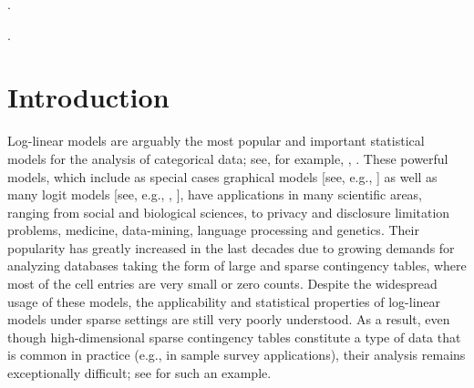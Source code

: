 \documentclass[aos,MSNbibl,nameyear,dvips]{arximspdf}
\begin{document}
\begin{frontmatter}
%
\begin{keyword}[class=AMS]
.
\end{keyword}
%
\begin{keyword}
.
\end{keyword}

\end{frontmatter}

\section{Introduction}

Log-linear models are arguably the most popular and important
statistical models for the analysis of categorical data; see, for
example, \citet{BFH75}, \citet{CHRISTENSEN97}. These powerful models,
which include as special cases graphical models [see, e.g.,
\citet{LAU96}] as well as many logit models [see, e.g., \citet{AGR02},
\citet{BFH75}], have applications in many scientific areas, ranging
from social and biological sciences, to privacy and disclosure
limitation problems, medicine, data-mining, language processing and
genetics. Their popularity has greatly increased in the last decades
due to growing demands for analyzing databases taking the form of large
and sparse contingency tables, where most of the cell entries are very
small or zero counts. Despite the widespread usage of these models, the
applicability and statistical properties of log-linear models under
sparse settings are still very poorly understood. As a result, even
though high-dimensional sparse contingency tables constitute a type of
data that is common in practice (e.g.,\vadjust{\goodbreak} in sample survey applications),
their analysis remains exceptionally difficult; see \citet{EFJ07} for
such an example.

\end{document}
